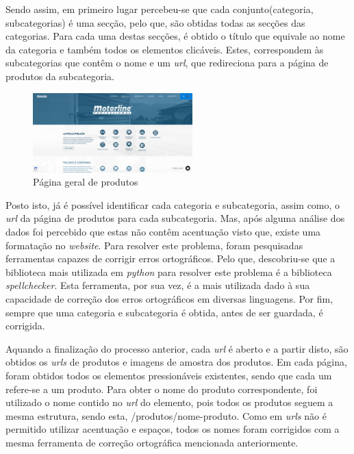 Sendo assim, em primeiro lugar percebeu-se que cada conjunto(categoria, subcategorias) é uma secção, pelo que, são obtidas todas as secções das categorias. Para cada uma destas secções, é obtido o título que equivale ao nome da categoria e também todos os elementos clicáveis. Estes, correspondem às subcategorias que contêm o nome e um \textit{url}, que redireciona para a página de produtos da subcategoria.

\begin{figure}[htb]
  \centering
  
  \includegraphics[width=0.55\textwidth]{images/implementacao/scraper/pagina_geral_produtos.png}
  \caption{Página geral de produtos}
  \label{fig:50}
\end{figure}

Posto isto, já é possível identificar cada categoria e subcategoria, assim como, o \textit{url} da página de produtos para cada subcategoria. Mas, após alguma análise dos dados foi percebido que estas não contêm acentuação visto que, existe uma formatação no \textit{website}. Para resolver este problema, foram pesquisadas ferramentas capazes de corrigir erros ortográficos. Pelo que, descobriu-se que a biblioteca mais utilizada em \textit{python} para resolver este problema é a biblioteca \textit{spellchecker}. Esta ferramenta, por sua vez, é a mais utilizada dado à sua capacidade de correção dos erros ortográficos em diversas linguagens. Por fim, sempre que uma categoria e subcategoria é obtida, antes de ser guardada, é corrigida.


Aquando a finalização do processo anterior, cada \textit{url} é aberto e a partir disto, são obtidos os \textit{urls} de produtos e imagens de amostra dos produtos. Em cada página, foram obtidos todos os elementos pressionáveis existentes, sendo que cada um refere-se a um produto. Para obter o nome do produto correspondente, foi utilizado o nome contido no \textit{url} do elemento, pois todos os produtos seguem a mesma estrutura, sendo esta, /produtos/nome-produto. Como em \textit{urls} não é permitido utilizar acentuação e espaços, todos os nomes foram corrigidos com a mesma ferramenta de correção ortográfica mencionada anteriormente.

